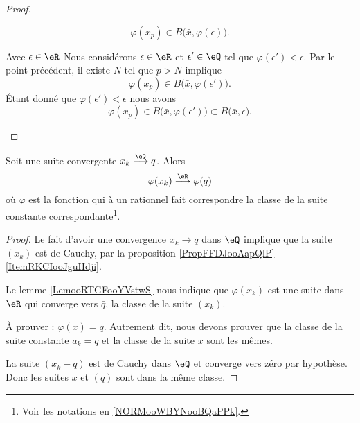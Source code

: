 \begin{proof}
\begin{subproof}
\begin{subproof}
            \begin{equation}
                \varphi(x_p)\in B\big( \bar x,\varphi(\epsilon) \big).
            \end{equation}
        \item[Avec \( \epsilon\in \eR\)]
            Nous considérons \( \epsilon\in \eR\) et \( \epsilon'\in \eQ\) tel que \( \varphi(\epsilon')<\epsilon\). Par le point précédent, il existe \( N\) tel que \( p>N\) implique
            \begin{equation}
                \varphi(x_p)\in B\big( \bar x,\varphi(\epsilon') \big).
            \end{equation}
            Étant donné que \( \varphi(\epsilon')<\epsilon\) nous avons 
            \begin{equation}
                \varphi(x_p)\in B\big( \bar x,\varphi(\epsilon') \big)\subset B\big( \bar x,\epsilon \big).
            \end{equation}
        \end{subproof}
    \end{subproof}
\end{proof}

\begin{proposition}     \label{PROPooZSQYooWRKNGY}
    Soit une suite convergente \( x_k\stackrel{\eQ}{\longrightarrow}q\). Alors
    \begin{equation}
        \varphi(x_k)\stackrel{\eR}{\longrightarrow}\varphi(q)
    \end{equation}
    où \( \varphi\) est la fonction qui à un rationnel fait correspondre la classe de la suite constante correspondante\footnote{Voir les notations en \ref{NORMooWBYNooBQaPPk}.}. 
\end{proposition}

\begin{proof}
    Le fait d'avoir une convergence \( x_k\to q\) dans \( \eQ\) implique que la suite \( (x_k)\) est de Cauchy, par la proposition \ref{PropFFDJooAapQlP}\ref{ItemRKCIooJguHdji}.
    
    Le lemme \ref{LemooRTGFooYVstwS} nous indique que \( \varphi(x_k)\) est une suite dans \( \eR\) qui converge vers \( \bar q\), la classe de la suite \( (x_k)\).

    À prouver : \( \varphi(x)=\bar q\). Autrement dit, nous devons prouver que la classe de la suite constante \( a_k=q\) et la classe de la suite \( x\) sont les mêmes.

    La suite \( (x_k-q)\) est de Cauchy dans \( \eQ\) et converge vers zéro par hypothèse. Donc les suites \(x\) et \( (q)\) sont dans la même classe.
\end{proof}

